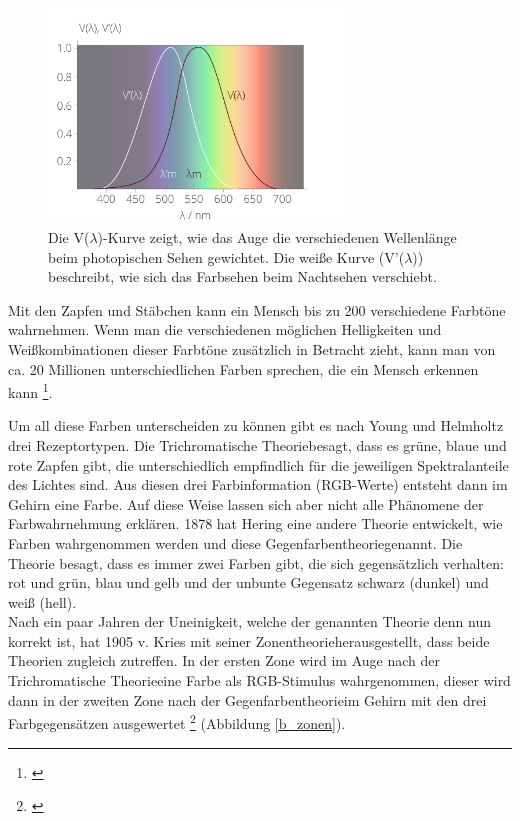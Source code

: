 \begin{figure}[H]     %
\centering
\includegraphics[width=0.7\textwidth]{bilder/augespek} 
\caption {Die V($\lambda$)-Kurve zeigt, wie das Auge die verschiedenen Wellenlänge beim photopischen Sehen gewichtet. Die weiße Kurve (V'($\lambda$)) beschreibt, wie sich das Farbsehen beim Nachtsehen verschiebt. \protect\footnotemark}\label{b_augespek}
\end{figure}



Mit den Zapfen und Stäbchen kann ein Mensch bis zu 200 verschiedene Farbtöne wahrnehmen. Wenn man die verschiedenen möglichen Helligkeiten und Weißkombinationen dieser Farbtöne zusätzlich in Betracht zieht, kann man von ca. 20 Millionen unterschiedlichen Farben sprechen, die ein Mensch erkennen kann \footnote{\cite{unimann}}.
 
Um all diese Farben unterscheiden zu können gibt es nach Young und Helmholtz drei Rezeptortypen. Die \glqq Trichromatische Theorie\grqq besagt, dass es grüne, blaue und rote Zapfen gibt, die unterschiedlich empfindlich für die jeweiligen Spektralanteile des Lichtes sind. Aus diesen drei Farbinformation (RGB-Werte) entsteht dann im Gehirn eine Farbe. Auf diese Weise lassen sich aber nicht alle Phänomene der Farbwahrnehmung erklären. 1878 hat Hering eine andere Theorie entwickelt, wie Farben wahrgenommen werden und diese \glqq Gegenfarbentheorie\grqq genannt. Die Theorie besagt, dass es immer zwei Farben gibt, die sich gegensätzlich verhalten: rot und grün, blau und gelb und der unbunte Gegensatz schwarz (dunkel) und weiß (hell).\\ Nach ein paar Jahren der Uneinigkeit, welche der genannten Theorie denn nun korrekt ist, hat 1905 v. Kries mit seiner \glqq Zonentheorie\grqq herausgestellt, dass beide Theorien zugleich zutreffen. In der ersten Zone wird im Auge nach der \glqq Trichromatische Theorie\grqq eine Farbe als RGB-Stimulus wahrgenommen, dieser wird dann in der zweiten Zone nach der \glqq Gegenfarbentheorie\grqq im Gehirn mit den drei Farbgegensätzen ausgewertet \footnote{\cite[104]{hentschel}} (Abbildung \ref{b_zonen}).

